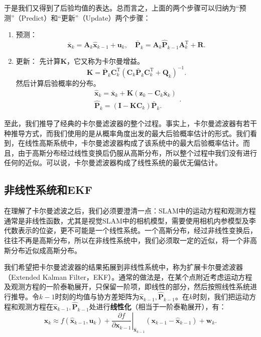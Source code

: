 于是我们又得到了后验均值的表达。总而言之，上面的两个步骤可以归纳为“预测”（Predict）和“更新”（Update）两个步骤：

\begin{mdframed}
\begin{enumerate}
	\item 预测：
	\begin{equation}
	\bar{\bm{x}}_k = {\bm{A}_k {{\hat{\bm{x}}}_{k - 1}} + {\bm{u}_k}}, \quad \bar{\bm{P}}_k = {\bm{A}_k \hat{\bm{P}}_{k-1} { \bm{A}^\mathrm{T}_k} + \bm{R}}.
	\end{equation}
	\item 更新：
	先计算$\bm{K}$，它又称为卡尔曼增益。
	\begin{equation}
	\label{eq:kalman-K-another}
	\bm{K} = {{\bar {\bm{P}}}_k} \bm{C}_k^\mathrm{T} {\left( {{\bm{C}_k}{{\bar {\bm{P}}}_k}\bm{C}_k^\mathrm{T} + {\bm{Q}_k}} \right)^{ - 1}}.
	\end{equation}
	然后计算后验概率的分布。
	\begin{equation}
	\begin{array}{l}
	\hat {\bm{x}}_k = {{\bar {\bm{x}}}_k} + \bm{K} \left( {\bm{z}_k - {\bm{C}_k}{\bm{\bar{x}}_k}} \right)\\
	{{\bm{\hat {P}}}_k} = \left( {\bm{I} - \bm{K}{\bm{C}_k}} \right) \bar{\bm{P}}_k.
	\end{array}.
	\end{equation}
\end{enumerate}
\end{mdframed}

至此，我们推导了经典的卡尔曼滤波器的整个过程。事实上，卡尔曼滤波器有若干种推导方式，而我们使用的是从概率角度出发的最大后验概率估计的形式。我们看到，在线性高斯系统中，卡尔曼滤波器构成了该系统中的最大后验概率估计。而且，由于高斯分布经过线性变换后仍服从高斯分布，所以整个过程中我们没有进行任何的近似。可以说，卡尔曼滤波器构成了线性系统的最优无偏估计。

\subsection{非线性系统和EKF}
在理解了卡尔曼滤波之后，我们必须要澄清一点：SLAM中的运动方程和观测方程通常是非线性函数，尤其是视觉SLAM中的相机模型，需要使用相机内参模型及李代数表示的位姿，更不可能是一个线性系统。一个高斯分布，经过非线性变换后，往往不再是高斯分布，所以在非线性系统中，我们必须取一定的近似，将一个非高斯分布近似成高斯分布。

我们希望把卡尔曼滤波器的结果拓展到非线性系统中，称为扩展卡尔曼滤波器（Extended Kalman Filter，EKF）。通常的做法是，在某个点附近考虑运动方程及观测方程的一阶泰勒展开，只保留一阶项，即线性的部分，然后按照线性系统进行推导。令$k-1$时刻的均值与协方差矩阵为$\bm{\hat{x}}_{k-1},\bm{\hat{P}}_{k-1}$。在$k$时刻，我们把运动方程和观测方程在$\bm{\hat{x}}_{k-1},\bm{\hat{P}}_{k-1}$处进行\textbf{线性化}（相当于一阶泰勒展开），有：
\begin{equation}
{\bm{x}_k} \approx f\left( {{{\bm{\hat x}}_{k - 1}},{\bm{u}_k}} \right) + {\left. {\frac{{\partial f}}{{\partial {\bm{x}_{k - 1}}}}} \right|_{{{\bm{\hat x}}_{k - 1}}}}\left( {{\bm{x}_{k - 1}} - {{\bm{\hat x}}_{k - 1}}} \right) + {\bm{w}_k}.
\end{equation}

